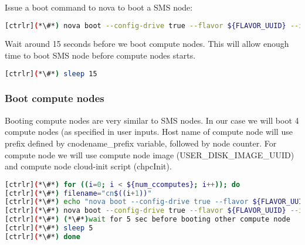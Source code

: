 Issue a boot command to nova to boot a SMS node:

\begin{lstlisting}[language=bash,keywords={}]
[ctrlr](*\#*) nova boot --config-drive true --flavor ${FLAVOR_UUID} --image ${SMS_DISK_IMAGE_UUID} --key-name ${KEYPAIR_NAME} --meta role=webservers --user-data=$chpcSMSInit --nic port-id=${SMS_PORT_ID} ${sms_name}
\end{lstlisting}


Wait around 15 seconds before we boot compute nodes. This will allow enough time to boot SMS node before compute nodes starts. 

\begin{lstlisting}[language=bash,keywords={}]
[ctrlr](*\#*) sleep 15
\end{lstlisting}

\subsubsection{Boot compute nodes}

Booting compute nodes are very similar to SMS nodes. In our case we will boot 4 compute nodes (as specified in user inputs. Host name of compute node will use prefix defined by cnodename\_prefix variable, followed by node counter. For compute node we will use compute node image (USER\_DISK\_IMAGE\_UUID) and compute node cloud-init script (chpcInit). 


\begin{lstlisting}[language=bash,keywords={}]
[ctrlr](*\#*) for ((i=0; i < ${num_ccomputes}; i++)); do
[ctrlr](*\#*) filename="cn$((i+1))"
[ctrlr](*\#*) echo "nova boot --config-drive true --flavor ${FLAVOR_UUID} --image ${USER_DISK_IMAGE_UUID} --key-name ${KEYPAIR_NAME} --meta role=webservers --user-data=$chpcInit --nic port-id=${NEUTRON_PORT_ID_CC[$i]} ${cnodename_prefix}$((i+1))" > boot_$filename
[ctrlr](*\#*) nova boot --config-drive true --flavor ${FLAVOR_UUID} --image ${USER_DISK_IMAGE_UUID} --key-name ${KEYPAIR_NAME} --meta role=webservers --user-data=$chpcInit --nic port-id=${NEUTRON_PORT_ID_CC[$i]} ${cnodename_prefix}$((i+1))
[ctrlr](*\#*) (*\#*)wait for 5 sec before booting other compute node
[ctrlr](*\#*) sleep 5
[ctrlr](*\#*) done
\end{lstlisting}
